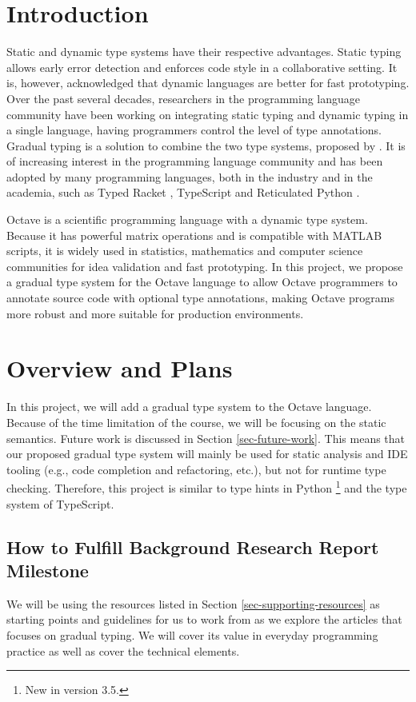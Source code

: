 \section{Introduction}
Static and dynamic type systems have their respective advantages. Static typing
allows early error detection and enforces code style in a collaborative setting.
It is, however, acknowledged that dynamic languages are better for fast
prototyping. Over the past several decades, researchers in the programming
language community have been working on integrating static typing and dynamic
typing in a single language, having programmers control the level of type
annotations. Gradual typing is a solution to combine the two type systems,
proposed by \cite{siek2006gradual}. It is of increasing interest in the
programming language community and has been adopted by many programming
languages, both in the industry and in the academia, such as Typed Racket
\cite{tobin2006interlanguage}, TypeScript \cite{bierman2014understanding} and
Reticulated Python \cite{vitousek2014design}.

Octave is a scientific programming language with a dynamic type system. Because
it has powerful matrix operations and is compatible with MATLAB scripts, it is
widely used in statistics, mathematics and computer science communities for idea
validation and fast prototyping. In this project, we propose a gradual type
system for the Octave language to allow Octave programmers to annotate source
code with optional type annotations, making Octave programs more robust and more
suitable for production environments.

\section{Overview and Plans}
In this project, we will add a gradual type system to the Octave language.
Because of the time limitation of the course, we will be focusing on the static
semantics. Future work is discussed in Section \ref{sec-future-work}. This means
that our proposed gradual type system will mainly be used for static analysis
and IDE tooling (e.g., code completion and refactoring, etc.), but not for
runtime type checking. Therefore, this project is similar to type hints in
Python \footnote{New in version 3.5.} and the type system of TypeScript.

\subsection{How to Fulfill Background Research Report Milestone}
We will be using the resources listed in Section \ref{sec-supporting-resources}
as starting points and guidelines for us to work from as we explore the articles
that focuses on gradual typing. We will cover its value in everyday programming
practice as well as cover the technical elements.


